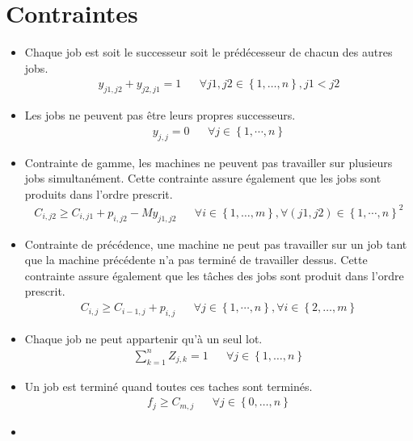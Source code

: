 \section*{Contraintes}

\begin{itemize}
	\item
	      Chaque job est soit le successeur soit le prédécesseur de chacun des autres jobs.
	      \begin{align}
		      y_{j1,j2}+y_{j2,j1}=1 &  &
		      \forall j1,j2\in\left\{1,\dotsc,n\right\}, j1<j2
	      \end{align}
	\item
	      Les jobs ne peuvent pas être leurs propres successeurs.
	      \begin{align}
		      y_{j,j}=0 &  &
		      \forall j\in \left\{1,\cdots, n\right\}
	      \end{align}
	\item
	      Contrainte de gamme, les machines ne peuvent pas travailler sur plusieurs jobs simultanément.
	      Cette contrainte assure également que les jobs sont produits dans l'ordre prescrit.
	      \begin{align}
		      C_{i,j2} \geq C_{i,j1}+p_{i,j2}-M y_{j1,j2} &  &
		      \forall i\in\left\{1,\dotsc,m\right\}, \forall\left(j1,j2\right)\in\left\{1,\cdots,n\right\}^2
	      \end{align}
	\item
	      Contrainte de précédence, une machine ne peut pas travailler sur un job tant que la machine précédente n’a pas terminé de travailler dessus.
	      Cette contrainte assure également que les tâches des jobs sont produit dans l'ordre prescrit.
	      \begin{align}
		      C_{i,j}\geq C_{i-1,j}+p_{i,j} &  &
		      \forall j\in\left\{1,\cdots,n\right\},\forall i\in\left\{2,\dotsc,m\right\}
	      \end{align}
	\item
	      Chaque job ne peut appartenir qu’à un seul lot.
	      \begin{align}
		      \sum_{k=1}^{n}Z_{j,k}=1 &  &
		      \forall j \in\left\{1,\dotsc,n \right\}
		\end{align}
	\item 
		Un job est terminé quand toutes ces taches sont terminés.
		\begin{align}
			f_j \geq C_{m, j} & & \forall j \in \left\{0,\dotsc,n\right\}
		\end{align}
	\item

\end{itemize}
